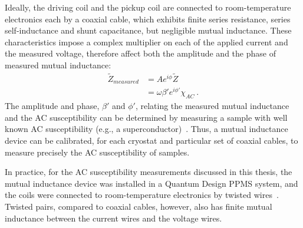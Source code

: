 Ideally, the driving coil and the pickup coil are connected to room-temperature electronics each by a coaxial cable, which exhibits finite series resistance, series self-inductance and shunt capacitance, but negligible mutual inductance. These characteristics impose a complex multiplier on each of the applied current and the measured voltage, therefore affect both the amplitude and the phase of measured mutual inductance:%
\begin{align}%
    \widetilde{Z}_{measured} &= Ae^{i\phi}\widetilde{Z}\nonumber\\
        &= \omega\beta'e^{i\phi'}\chi_{AC}~.\label{eq:mi_coax}
\end{align}%
The amplitude and phase, $\beta'$ and $\phi'$, relating the measured mutual inductance and the AC susceptibility can be determined by measuring a sample with well known AC susceptibility (e.g., a superconductor)~\cite{Jeanneret1989, HahnThesis}. Thus, a mutual inductance device can be calibrated, for each cryostat and particular set of coaxial cables, to measure precisely the AC susceptibility of samples.

In practice, for the AC susceptibility measurements discussed in this thesis, the mutual inductance device was installed in a Quantum Design PPMS system, and the coils were connected to room-temperature electronics by twisted wires~\cite{ppms_ac}. Twisted pairs, compared to coaxial cables, however, also has finite mutual inductance between the current wires and the voltage wires. 